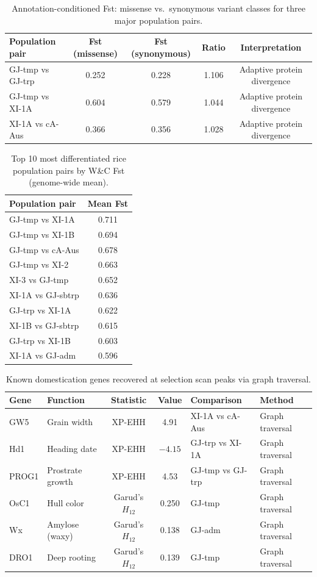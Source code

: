\begin{table}[h]
\caption{Annotation-conditioned Fst: missense vs.\ synonymous variant classes for three major population pairs.}
\label{tab:rice_fst_conditioned}
\centering
\small
\begin{tabular}{lcccc}
\toprule
Population pair & Fst (missense) & Fst (synonymous) & Ratio & Interpretation \\
\midrule
GJ-tmp vs GJ-trp & 0.252 & 0.228 & 1.106 & Adaptive protein divergence \\
GJ-tmp vs XI-1A & 0.604 & 0.579 & 1.044 & Adaptive protein divergence \\
XI-1A vs cA-Aus & 0.366 & 0.356 & 1.028 & Adaptive protein divergence \\
\bottomrule
\end{tabular}
\end{table}

\begin{table}[h]
\caption{Top 10 most differentiated rice population pairs by W\&C Fst (genome-wide mean).}
\label{tab:rice_fst_top}
\centering
\small
\begin{tabular}{lc}
\toprule
Population pair & Mean Fst \\
\midrule
GJ-tmp vs XI-1A & 0.711 \\
GJ-tmp vs XI-1B & 0.694 \\
GJ-tmp vs cA-Aus & 0.678 \\
GJ-tmp vs XI-2 & 0.663 \\
XI-3 vs GJ-tmp & 0.652 \\
XI-1A vs GJ-sbtrp & 0.636 \\
GJ-trp vs XI-1A & 0.622 \\
XI-1B vs GJ-sbtrp & 0.615 \\
GJ-trp vs XI-1B & 0.603 \\
XI-1A vs GJ-adm & 0.596 \\
\bottomrule
\end{tabular}
\end{table}

\begin{table}[h]
\caption{Known domestication genes recovered at selection scan peaks via graph traversal.}
\label{tab:rice_genes}
\centering
\small
\begin{tabular}{llccll}
\toprule
Gene & Function & Statistic & Value & Comparison & Method \\
\midrule
GW5 & Grain width & XP-EHH & 4.91 & XI-1A vs cA-Aus & Graph traversal \\
Hd1 & Heading date & XP-EHH & $-4.15$ & GJ-trp vs XI-1A & Graph traversal \\
PROG1 & Prostrate growth & XP-EHH & 4.53 & GJ-tmp vs GJ-trp & Graph traversal \\
OsC1 & Hull color & Garud's $H_{12}$ & 0.250 & GJ-tmp & Graph traversal \\
Wx & Amylose (waxy) & Garud's $H_{12}$ & 0.138 & GJ-adm & Graph traversal \\
DRO1 & Deep rooting & Garud's $H_{12}$ & 0.139 & GJ-tmp & Graph traversal \\
\bottomrule
\end{tabular}
\end{table}

